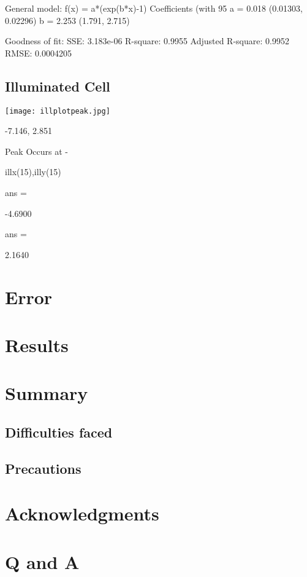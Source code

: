 \documentclass{article}
\begin{document}
General model:
     f(x) = a*(exp(b*x)-1)
Coefficients (with 95%
       a =       0.018  (0.01303, 0.02296)
       b =       2.253  (1.791, 2.715)

Goodness of fit:
  SSE: 3.183e-06
  R-square: 0.9955
  Adjusted R-square: 0.9952
  RMSE: 0.0004205
  
\subsection{Illuminated Cell}

\texttt{[image: illplotpeak.jpg]}


-7.146, 2.851

Peak Occurs at -

illx(15),illy(15)

ans =

   -4.6900


ans =

    2.1640

\section{Error}

\section{Results}

\section{Summary}

\subsection{Difficulties faced}

\subsection{Precautions}

\section{Acknowledgments}

\section{Q and A}
\end{document}
